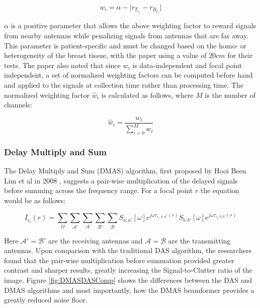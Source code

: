 \begingroup
\large
\begin{equation}
    w_i = \alpha -  \lvert r_{T_{r_i}} - r_{R_{c_i}} \rvert
\end{equation}
\endgroup

$\alpha$ is a positive parameter that allows the above weighting factor to reward signals from nearby antennas while
penalizing signals from antennas that are far away. This parameter is patient-specific and must be changed based on the
homo- or heterogeneity of the breast tissue, with the paper using a value of $20cm$ for their tests. The paper also
noted that since $w_i$ is data-independent and focal point independent, a set of normalized weighting factors can be
computed before hand and applied to the signals at collection time rather than processing time. The normalized weighting
factor $\hat{w}_i$ is calculated as follows, where $M$ is the number of channels:

\begingroup
\large
\begin{equation}
    \hat{w}_i = \frac{w_i}{\sum_{i=0}^{M} w_i}
\end{equation} 
\endgroup

\subsubsection{Delay Multiply and Sum}
The Delay Multiply and Sum (DMAS) algorithm, first proposed by Hooi Been Lim et al in 2008
\cite{h.beenlimConfocalMicrowaveImaging2008}, suggests a pair-wise multiplication of the delayed signals before summing
across the frequency range. For a focal point $r$ the equation would be as follows:


\begingroup
\large
\begin{equation}
    I_{\epsilon_i}(r) = \sum_{\Omega}\sum_{\mathcal{A}'}\sum_{\mathcal{A}}\sum_{\mathcal{B}'}\sum_{\mathcal{B}} S_{a, a'}[\omega]e^{j\omega \tau_{\epsilon_i, a, a'}(r)} S_{b, b'}[\omega]e^{j\omega \tau_{\epsilon_i, b, b'}(r)}
    \label{eq:DMASBeamformer}
\end{equation}
\endgroup

Here $\mathcal{A}' = \mathcal{B}'$ are the receiving antennas and $\mathcal{A} = \mathcal{B}$ are the transmitting
antennas. Upon comparison with the traditional DAS algorithm, the researchers found that the pair-wise multiplication
before summation provided greater contrast and sharper results, greatly increasing the Signal-to-Clutter ratio of the
image. Figure \ref{fig:DMASDASComp} shows the differences between the DAS and DMAS algorithms and most
importantly, how the DMAS beamformer provides a greatly reduced noise floor.

